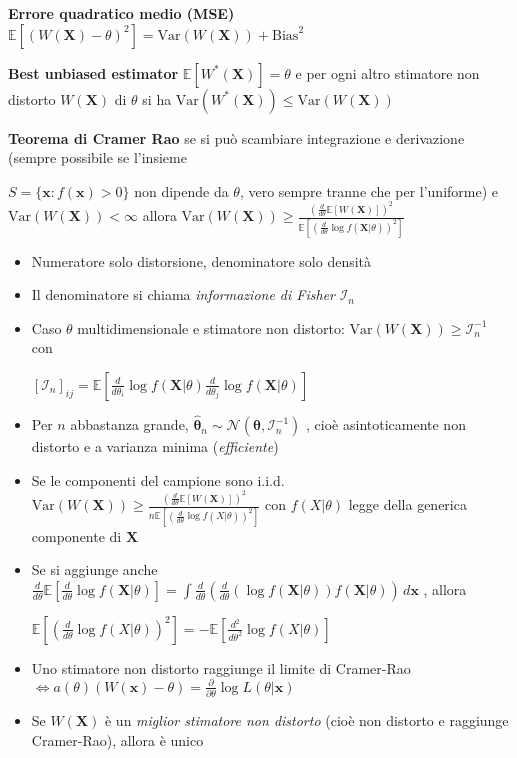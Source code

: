 \documentclass[openany]{book} %
\begin{document}
\textbf{Errore quadratico medio (MSE)} $\mathbb{E}[(W(\boldsymbol{X})-\theta)^2]=\text{Var}(W(\boldsymbol{X}))+\text{Bias}^2$

\textbf{Best unbiased estimator} $\mathbb{E}[W^*(\boldsymbol{X})]=\theta$ e per ogni altro stimatore non distorto $W(\boldsymbol{X})$ di $\theta$ si ha $\text{Var}(W^*(\boldsymbol{X}))\leq \text{Var}(W(\boldsymbol{X}))$

\textbf{Teorema di Cramer Rao} se si può scambiare integrazione e derivazione (sempre possibile se l'insieme 

$S=\{\boldsymbol{x}:f(\boldsymbol{x})>0\}$ non dipende da $\theta$, vero sempre tranne che per l'uniforme) e $\text{Var}(W(\boldsymbol{X}))<\infty$ allora $\text{Var}(W(\boldsymbol{X}))\geq \frac{(\frac{d}{d\theta}\mathbb{E}[W(\boldsymbol{X})])^2}{\mathbb{E}[(\frac{d}{d\theta}\log f(\boldsymbol{X}|\theta))^2]}$

\begin{itemize}

\item Numeratore solo distorsione, denominatore solo densità

\item Il denominatore si chiama \textit{informazione di Fisher} $\mathcal{I}_n$

\item Caso $\theta$ multidimensionale e stimatore non distorto: $\text{Var}(W(\boldsymbol{X}))\geq \mathcal{I}_n^{-1}$ con 

$[\mathcal{I}_n]_{ij}=\mathbb{E}[\frac{d}{d\theta_i}\log f(\boldsymbol{X}|\theta)\frac{d}{d\theta_j}\log f(\boldsymbol{X}|\theta)]$

\item Per $n$ abbastanza grande, $\hat {\boldsymbol{\theta}}_n\sim \mathcal{N}(\boldsymbol{\theta},\mathcal{I}_n^{-1})$ , cioè asintoticamente non distorto e a varianza minima (\textit{efficiente})

\item Se le componenti del campione sono i.i.d. $\text{Var}(W(\boldsymbol{X}))\geq \frac{(\frac{d}{d\theta}\mathbb{E}[W(\boldsymbol{X})])^2}{n\mathbb{E}[(\frac{d}{d\theta}\log f(X|\theta))^2]}$ con $f(X|\theta)$  legge della generica componente di $\boldsymbol{X}$

\item Se si aggiunge anche $\frac{d}{d\theta}\mathbb{E}[\frac{d}{d\theta}\log f(\boldsymbol{X}|\theta)]=\int\frac{d}{d\theta}(\frac{d}{d\theta}(\log f(\boldsymbol{X}|\theta))f(\boldsymbol{X}|\theta))\,d \boldsymbol{x}$ , allora 

$\mathbb{E}[(\frac{d}{d\theta}\log f(X|\theta))^2]=-\mathbb{E}[\frac{d^2}{d\theta^2}\log f(X|\theta)]$

\item Uno stimatore non distorto raggiunge il limite di Cramer-Rao $\Leftrightarrow a(\theta)(W(\boldsymbol{x})-\theta)=\frac{\partial}{\partial\theta}\log L(\theta|\boldsymbol{x})$

\item Se $W(\boldsymbol{X})$ è un \textit{miglior stimatore non distorto} (cioè non distorto e raggiunge Cramer-Rao), allora è unico

\end{itemize}
\end{document}
